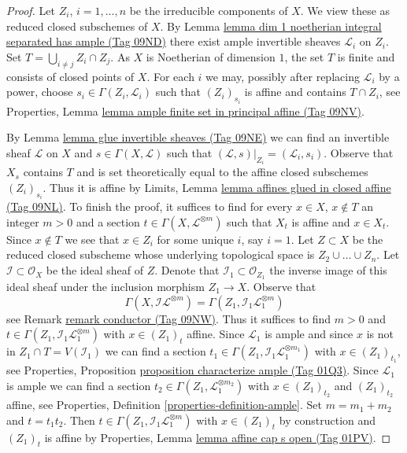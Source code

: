 \documentclass{amsart}
\theoremstyle{plain}
\theoremstyle{definition}
\theoremstyle{remark}
\numberwithin{equation}{subsection}
\begin{document}
\begin{proof}
Let $Z_i$, $i = 1, \ldots, n$ be the irreducible components of $X$.
We view these as reduced closed subschemes of $X$.
By Lemma \href{https://stacks.math.columbia.edu/tag/09ND}{lemma dim 1 noetherian integral separated has ample (Tag 09ND)}
there exist ample invertible sheaves $\mathcal{L}_i$ on $Z_i$.
Set $T = \bigcup_{i \not = j} Z_i \cap Z_j$. As $X$ is Noetherian
of dimension $1$, the set $T$ is finite and consists of closed
points of $X$. For each $i$ we may, possibly after replacing
$\mathcal{L}_i$ by a power, choose $s_i \in \Gamma(Z_i, \mathcal{L}_i)$
such that $(Z_i)_{s_i}$ is affine and contains $T \cap Z_i$, see
Properties, Lemma \href{https://stacks.math.columbia.edu/tag/09NV}{lemma ample finite set in principal affine (Tag 09NV)}.

\medskip\noindent
By Lemma \href{https://stacks.math.columbia.edu/tag/09NE}{lemma glue invertible sheaves (Tag 09NE)} we can find an invertible sheaf
$\mathcal{L}$ on $X$ and $s \in \Gamma(X, \mathcal{L})$
such that $(\mathcal{L}, s)|_{Z_i} = (\mathcal{L}_i, s_i)$.
Observe that $X_s$ contains $T$ and is set theoretically equal
to the affine closed subschemes $(Z_i)_{s_i}$. Thus it is affine by
Limits, Lemma \href{https://stacks.math.columbia.edu/tag/09NL}{lemma affines glued in closed affine (Tag 09NL)}.
To finish the proof, it suffices to find for every $x \in X$, $x \not \in T$
an integer $m > 0$ and a section $t \in \Gamma(X, \mathcal{L}^{\otimes m})$
such that $X_t$ is affine and $x \in X_t$. Since $x \not \in T$
we see that $x \in Z_i$ for some unique $i$, say $i = 1$.
Let $Z \subset X$ be the reduced closed subscheme whose underlying
topological space is $Z_2 \cup \ldots \cup Z_n$.
Let $\mathcal{I} \subset \mathcal{O}_X$ be the ideal
sheaf of $Z$. Denote that $\mathcal{I}_1 \subset \mathcal{O}_{Z_1}$
the inverse image of this ideal sheaf under the inclusion
morphism $Z_1 \to X$. Observe that
$$
\Gamma(X, \mathcal{I}\mathcal{L}^{\otimes m}) =
\Gamma(Z_1, \mathcal{I}_1 \mathcal{L}_1^{\otimes m})
$$
see Remark \href{https://stacks.math.columbia.edu/tag/09NW}{remark conductor (Tag 09NW)}. Thus it suffices to find $m > 0$
and $t \in \Gamma(Z_1, \mathcal{I}_1 \mathcal{L}_1^{\otimes m})$
with $x \in (Z_1)_t$ affine. Since $\mathcal{L}_1$ is ample
and since $x$ is not in $Z_1 \cap T = V(\mathcal{I}_1)$
we can find a section
$t_1 \in \Gamma(Z_1, \mathcal{I}_1 \mathcal{L}_1^{\otimes m_1})$
with $x \in (Z_1)_{t_1}$, see Properties, Proposition
\href{https://stacks.math.columbia.edu/tag/01Q3}{proposition characterize ample (Tag 01Q3)}.
Since $\mathcal{L}_1$ is ample we can find a section
$t_2 \in \Gamma(Z_1, \mathcal{L}_1^{\otimes m_2})$
with $x \in (Z_1)_{t_2}$ and $(Z_1)_{t_2}$ affine, see
Properties, Definition \ref{properties-definition-ample}.
Set $m = m_1 + m_2$ and $t = t_1 t_2$. Then
$t \in \Gamma(Z_1, \mathcal{I}_1 \mathcal{L}_1^{\otimes m})$
with $x \in (Z_1)_t$ by construction and
$(Z_1)_t$ is affine by Properties, Lemma
\href{https://stacks.math.columbia.edu/tag/01PV}{lemma affine cap s open (Tag 01PV)}.
\end{proof}
\end{document}
